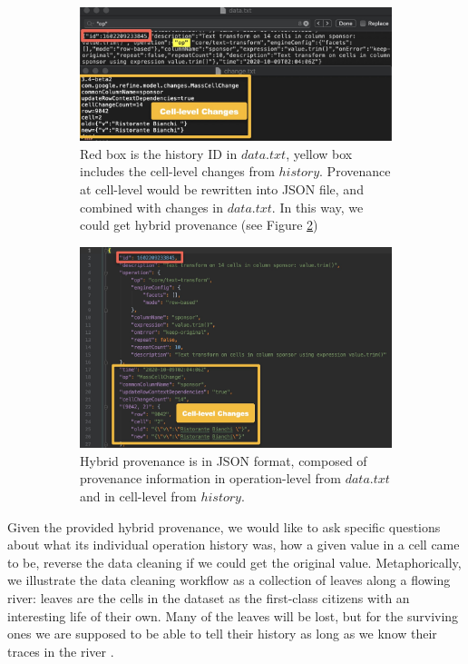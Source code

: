 \begin{figure}

\begin{subfigure}{.5\textwidth}
  \centering
  \includegraphics[width=1\linewidth, scale=1]{Figure/data-his-pair.jpeg}
  \caption{Red box is the history ID in $data.txt$, yellow box includes the cell-level changes from $history$. Provenance at cell-level would be rewritten into JSON file, and combined with changes in $data.txt$. In this way, we could get hybrid provenance (see Figure \ref{fig:hp})}
  \label{fig:pair}
\end{subfigure}%
\hspace{1em}
\begin{subfigure}{.4\textwidth}
  \centering
  \includegraphics[width=1\linewidth, scale =0.8]{Figure/Hybrid.jpeg}
  \caption{Hybrid provenance is in JSON format, composed of provenance information in operation-level from $data.txt$ and in cell-level from $history$. }
  \label{fig:hp}
\end{subfigure}
\caption{}
\label{fig:hp process}
\end{figure}


Given the provided hybrid provenance, we would like to ask specific
questions about what its individual operation history was, how a given value in a cell came to be, reverse the data cleaning if we could get the original value. Metaphorically, we illustrate the data cleaning workflow as a collection of leaves along a flowing river: leaves are the cells in the dataset as the first-class citizens with an interesting life of their own. Many of the leaves will be lost, but for the surviving ones we are supposed to be able to tell their history as long as we know their traces in the river \cite{nunez2020first}.

